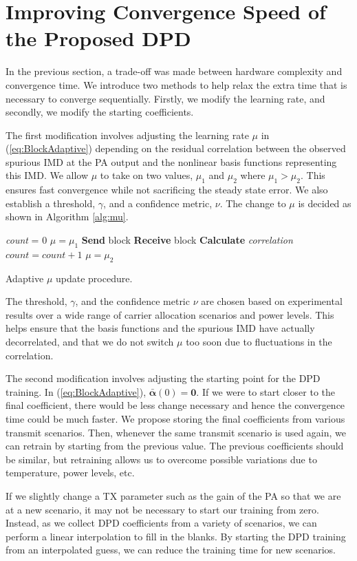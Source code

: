 \section{Improving Convergence Speed of the Proposed DPD}
\label{sec:ConvergenceSpeed}
In the previous section, a trade-off was made between hardware complexity and convergence time. We introduce two methods to help relax the extra time that is necessary to converge sequentially. 
Firstly, we modify the learning rate, and secondly, we modify the starting coefficients.

The first modification involves adjusting the learning rate $\mu$ in (\ref{eq:BlockAdaptive}) depending on the residual correlation between the observed spurious IMD at the PA output and the nonlinear basis functions representing this IMD.
 We allow $\mu$ to take on two values, $\mu_1$ and $\mu_2$ where $\mu_1 > \mu_2$. 
 This ensures fast convergence while not sacrificing the steady state error. 
 We also establish a threshold, $\gamma$, and a confidence metric, $\nu$. 
 The change to $\mu$ is decided as shown in Algorithm \ref{alg:mu}.
\begin{algorithm}[h]
\SetAlgoLined
\textit{count} = 0\;
$\mu = \mu_1$\;
 {
  \textbf{Send} block\;
  \textbf{Receive} block\;
  \textbf{Calculate} \textit{correlation}\;
  {
   $count = count + 1$\; 
  }
  {
   $\mu = \mu_2$\; 
  }
 }
\caption{Adaptive $\mu$ update procedure.}
\label{alg:mu}
\end{algorithm}
The threshold, $\gamma$, and the confidence metric $\nu$ are chosen based on experimental results over a wide range of carrier allocation scenarios and power levels. 
This helps ensure that the basis functions and the spurious IMD have actually decorrelated, and that we do not switch $\mu$ too soon due to fluctuations in the correlation.

The second modification involves adjusting the starting point for the DPD training. 
In (\ref{eq:BlockAdaptive}), $\bar{\boldsymbol{\alpha}}(0) = \mathbf{0}$. 
If we were to start closer to the final coefficient, there would be less change necessary and hence the convergence time could be much faster. 
We propose storing the final coefficients from various transmit scenarios. 
Then, whenever the same transmit scenario is used again, we can retrain by starting from the previous value. The previous coefficients should be similar, but retraining allows us to overcome possible variations due to temperature, power levels, etc. 

If we slightly change a TX parameter such as the gain of the PA so that we are at a new scenario, it may not be necessary to start our training from zero. Instead, as we collect DPD coefficients from a variety of scenarios, we can perform a linear interpolation to fill in the blanks. By starting the DPD training from an interpolated guess, we can reduce the training time for new scenarios.


